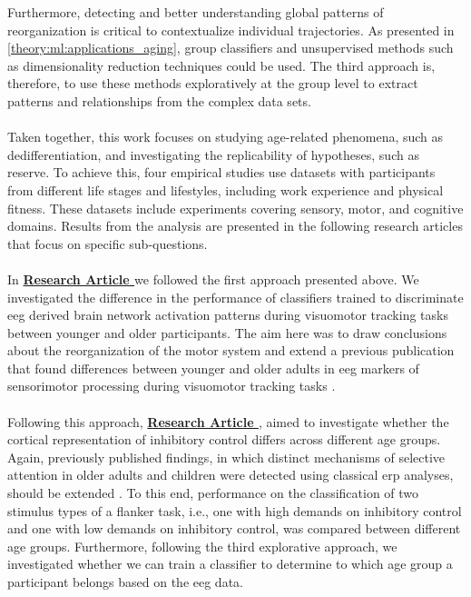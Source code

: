Furthermore, detecting and better understanding global patterns of reorganization is critical to contextualize individual trajectories. As presented in \ref{theory:ml:applications_aging}, group classifiers and unsupervised methods such as dimensionality reduction techniques could be used. The third approach is, therefore, to use these methods exploratively at the group level to extract patterns and relationships from the complex data sets.\\
\\
Taken together, this work focuses on studying age-related phenomena, such as dedifferentiation, and investigating the replicability of hypotheses, such as reserve. To achieve this, four empirical studies use datasets with participants from different life stages and lifestyles, including work experience and physical fitness. These datasets include experiments covering sensory, motor, and cognitive domains. Results from the analysis are presented in the following research articles that focus on specific sub-questions.\\
\\
In \textbf{\hyperref[pub:paperI]{Research Article }} we followed the first approach presented above. We investigated the difference in the performance of classifiers trained to discriminate \gls{eeg} derived brain network activation patterns during visuomotor tracking tasks between younger and older participants. The aim here was to draw conclusions about the reorganization of the motor system and extend a previous publication that found differences between younger and older adults in \gls{eeg} markers of sensorimotor processing during visuomotor tracking tasks \cite{Vieluf2018}.\\
\\
Following this approach, \textbf{\hyperref[pub:paperII]{Research Article }}, aimed to investigate whether the cortical representation of inhibitory control differs across different age groups. Again, previously published findings, in which distinct mechanisms of selective attention in older adults and children were detected using classical \gls{erp} analyses, should be extended \cite{Reuter2019}. To this end, performance on the classification of two stimulus types of a flanker task, i.e., one with high demands on inhibitory control and one with low demands on inhibitory control, was compared between different age groups. Furthermore, following the third explorative approach, we investigated whether we can train a classifier to determine to which age group a participant belongs based on the \gls{eeg} data.\\
